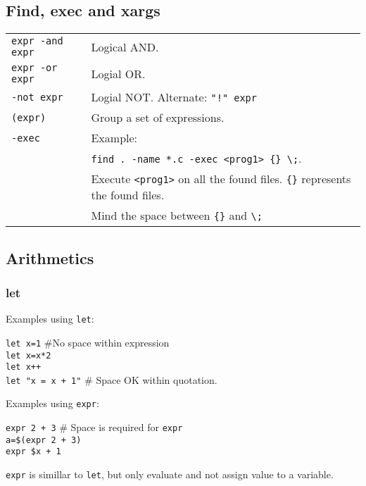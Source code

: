 \subsection{Find, exec and xargs}

\begin{tabularx}{\linewidth}{lX}
    \texttt{expr -and expr} & Logical AND.\\
    \texttt{expr -or expr} & Logial OR.\\
    \texttt{-not expr} & Logial NOT. Alternate: \texttt{"!" expr}\\
    \texttt{(expr)} & Group a set of expressions.\\
    \texttt{-exec} & Example: \\
    & \texttt{find . -name *.c -exec <prog1> \{\} \textbackslash ;}.\\
    & Execute \texttt{<prog1>} on all the found files. \texttt{\{\}} represents the found files. \\
    & Mind the space between \texttt{\{\}} and \texttt{\textbackslash;}\\
\hline

\end{tabularx}




\subsection{Arithmetics}
\subsubsection{let}
Examples using \texttt{let}:\\

\begin{mdframed}
\texttt{let x=1} \#No space within expression\\
\texttt{let x=x*2}\\
\texttt{let x++}\\
\texttt{let "x = x + 1"} \# Space OK within quotation.
\end{mdframed}

Examples using \texttt{expr}:
\begin{mdframed}
\texttt{expr 2 + 3} \# Space is required for \texttt{expr}\\
\texttt{a=\$(expr 2 + 3)}\\
\texttt{expr \$x + 1}
\end{mdframed}

\texttt{expr} is simillar to \texttt{let}, but only evaluate and not assign value to a variable.\\

